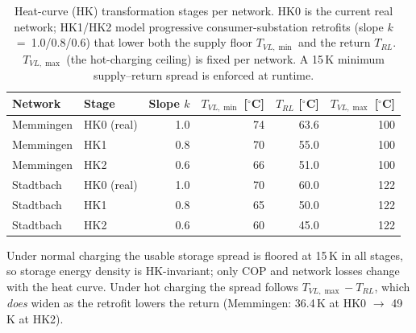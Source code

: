 \begin{table}[htbp]
  \centering
  \caption{Heat-curve (HK) transformation stages per network. HK0 is the current
  real network; HK1/HK2 model progressive consumer-substation retrofits (slope
  $k$~=~1.0/0.8/0.6) that lower both the supply floor $T_{VL,\min}$ and the return
  $T_{RL}$. $T_{VL,\max}$ (the hot-charging ceiling) is fixed per network. A 15\,K
  minimum supply--return spread is enforced at runtime.}
  \label{tab:t2c_heat_curve}
  \small
  \begin{tabular}{@{}llrrrr@{}}
  \toprule
  Network & Stage & Slope $k$ & $T_{VL,\min}$ [$^\circ$C] & $T_{RL}$ [$^\circ$C] & $T_{VL,\max}$ [$^\circ$C] \\
  \midrule
  Memmingen & HK0 (real) & 1.0 & 74 & 63.6 & 100 \\
  Memmingen & HK1        & 0.8 & 70 & 55.0 & 100 \\
  Memmingen & HK2        & 0.6 & 66 & 51.0 & 100 \\
  \midrule
  Stadtbach & HK0 (real) & 1.0 & 70 & 60.0 & 122 \\
  Stadtbach & HK1        & 0.8 & 65 & 50.0 & 122 \\
  Stadtbach & HK2        & 0.6 & 60 & 45.0 & 122 \\
  \bottomrule
  \end{tabular}

  \vspace{2pt}
  {\footnotesize Under normal charging the usable storage spread is floored at 15\,K
  in all stages, so storage energy density is HK-invariant; only COP and network
  losses change with the heat curve. Under hot charging the spread follows
  $T_{VL,\max}-T_{RL}$, which \emph{does} widen as the retrofit lowers the return
  (Memmingen: 36.4\,K at HK0 $\to$ 49\,K at HK2).}
\end{table}
